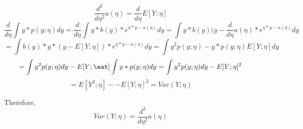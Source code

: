 \begin{answer}
    \begin{equation*}
        \frac{d^{2}}{d\eta^{2}}a(\eta) = \frac{d}{d\eta}E[Y;\eta]
    \end{equation*}
    \begin{equation*}
        \frac{d}{d\eta}\int y*p(y;\eta)dy =  \frac{d}{d\eta}\int y*b(y)*e^{\eta*y-a(\eta)}dy = \int y*b(y)(y-\frac{d}{d\eta}a(\eta)*e^{\eta*y-a(\eta)}dy
    \end{equation*}
    \begin{equation*}
        = \int b(y)*y*(y-E[Y;\eta])*e^{\eta*y-a(\eta)}dy = \int y^{2}p(y;\eta) - y*p(y;\eta)E[Y;\eta] dy
    \end{equation*}
    \begin{equation*}
        = \int y^{2}p(y;\eta) dy - E[Y;\eat]\int y*p(y;\eta)dy =
        \int y^{2}p(y;\eta) dy - E[Y;\eta]^{2}
    \end{equation*}
    \begin{equation*}
        = E[Y^{2};\eta] - - E[Y;\eta]^{2} = Var(Y;\eta)
    \end{equation*}
    
    Therefore,
    \begin{equation*}
        Var(Y;\eta) =  \frac{d^{2}}{d\eta^{2}}a(\eta)
    \end{equation*}
\end{answer}
